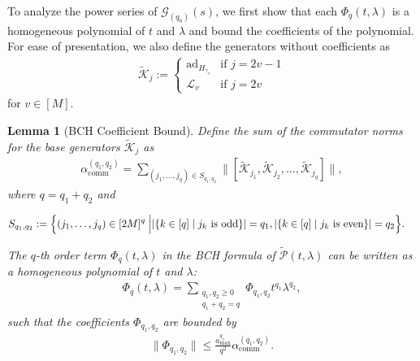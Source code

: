 \documentclass[aps,pra,reprint,groupedaddress,floatfix]{revtex4-2}
\newtheorem{lemma}{Lemma}
\newcommand{\ad}{\mathrm{ad}}
\renewcommand{\P}{\mathcal{P}}
\newcommand{\G}{\mathcal{G}}
\renewcommand{\comm}{\mathrm{comm}}
\newcommand{\mc}{\mathcal}
\begin{document}
To analyze the power series of $\G_{(q_0)}(s)$, we first show that each $\Phi_q(t,\lambda)$ is a homogeneous polynomial of $t$ and $\lambda$ and bound the coefficients of the polynomial. For ease of presentation, we also define the generators without coefficients as
\begin{align}
\label{eq:def-K-tilde}
 	\tilde{\mathcal{K}}_j := \begin{cases}\ad_{H_{\gamma_v}} & \text{if } j = 2v-1\\ \mathcal{L}_v & \text{if } j = 2v \end{cases}
\end{align}
for $v \in [M]$.
\begin{lemma}[BCH Coefficient Bound]
\label{lem:bch-bound}
 	Define the sum of the commutator norms for the base generators $\tilde{\mc K}_j$ as
 	\begin{align}
 	\label{eq:alpha-q-q}
 	\alpha_{\comm}^{(q_1, q_2)}=\sum_{(j_1, \ldots, j_q)\in S_{q_1, q_2}}\big\|[\tilde{\mc K}_{j_1}, \tilde{\mc K}_{j_2},\ldots,\tilde{\mc K}_{j_q}]\big\|,
 	\end{align}
 	where $q = q_1+q_2$ and
    \begin{widetext}
 	\begin{align}
 	\label{eq:S-q-q}
 	 	S_{q_1, q_2}:=\Bigl\{(j_1, \ldots, j_q)\in [2M]^q\Bigm| &|\{k\in [q]\mid j_k \text{ is odd}\}|=q_1, |\{k\in [q]\mid j_k \text{ is even}\}|=q_2\Bigr\}. \nonumber
 	\end{align}
    \end{widetext}
 	The $q$-th order term $\Phi_q(t,\lambda)$ in the BCH formula of $\tilde{\P}(t,\lambda)$ can be written as a homogeneous polynomial of $t$ and $\lambda$:
 	\begin{align}
 	\Phi_q(t,\lambda) = \sum_{\substack{q_1, q_2 \ge 0\\q_1+q_2 = q}}\Phi_{q_1, q_2} t^{q_1}\lambda^{q_2},
 	\end{align}
 	such that the coefficients $\Phi_{q_1, q_2}$ are bounded by
 	\begin{align}
 	\|\Phi_{q_1, q_2}\|\le \frac{a_{\max}^{q_1}}{q^2}\alpha_{\comm}^{(q_1, q_2)}.
 	\end{align}
\end{lemma}
\end{document}
